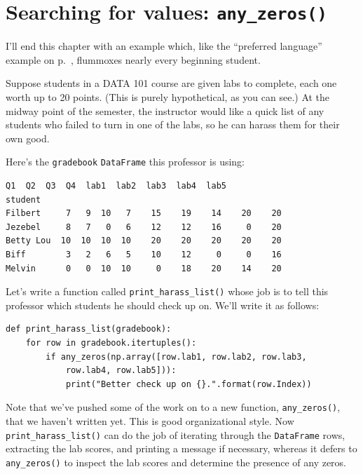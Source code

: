 \smallskip

\section{Searching for values: \texttt{any\_zeros()}}

I'll end this chapter with an example which, like the ``preferred language''
example on p.~\pageref{spanishFrenchPitfall}, flummoxes nearly every beginning
student.

Suppose students in a DATA 101 course are given labs to complete, each one
worth up to 20 points. (This is purely hypothetical, as you can see.) At the
midway point of the semester, the instructor would like a quick list of any
students who failed to turn in one of the labs, so he can harass them for their
own good.


Here's the \texttt{gradebook} \texttt{DataFrame} this professor is using:

\begin{Verbatim}[fontsize=\footnotesize,samepage=true,frame=leftline,framesep=5mm,framerule=1mm]
           Q1  Q2  Q3  Q4  lab1  lab2  lab3  lab4  lab5
student                                                
Filbert     7   9  10   7    15    19    14    20    20
Jezebel     8   7   0   6    12    12    16     0    20
Betty Lou  10  10  10  10    20    20    20    20    20
Biff        3   2   6   5    10    12     0     0    16
Melvin      0   0  10  10     0    18    20    14    20
\end{Verbatim}


Let's write a function called \texttt{print\_harass\_list()} whose job is to
tell this professor which students he should check up on. We'll write it as
follows:

\begin{Verbatim}[fontsize=\footnotesize,samepage=true,frame=single,framesep=3mm]
def print_harass_list(gradebook):
    for row in gradebook.itertuples():
        if any_zeros(np.array([row.lab1, row.lab2, row.lab3,
            row.lab4, row.lab5])):
            print("Better check up on {}.".format(row.Index))
\end{Verbatim}


Note that we've pushed some of the work on to a new function,
\texttt{any\_zeros()}, that we haven't written yet. This is good organizational
style. Now \texttt{print\_harass\_list()} can do the job of iterating through
the \texttt{DataFrame} rows, extracting the lab scores, and printing a message
if necessary, whereas it defers to \texttt{any\_zeros()} to inspect the lab
scores and determine the presence of any zeros.

